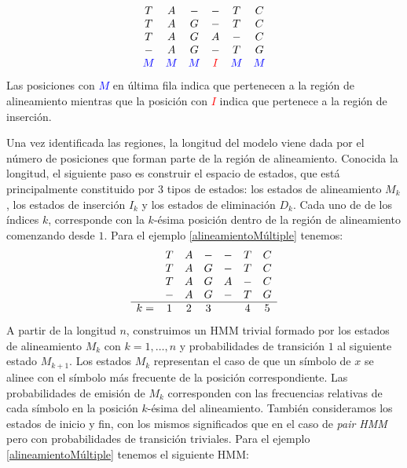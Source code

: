 \begin{exampleth} \label{alineamientoMúltiple}
    \[\begin{array}{c c c c c c}
        T & A & - & -  & T & C \\
        T & A & G & -  & T & C \\
        T & A & G & A  & - & C \\
        - & A & G & -  & T & G \\
        \textcolor{blue}{M} & \textcolor{blue}{M} & \textcolor{blue}{M} & \textcolor{red}{I} & \textcolor{blue}{M} & \textcolor{blue}{M}
    \end{array}\]    
    Las posiciones con \textcolor{blue}{$M$} en última fila indica que pertenecen a la región de alineamiento mientras que la posición con \textcolor{red}{$I$} indica que pertenece a la región de inserción.
\end{exampleth}

Una vez identificada las regiones, la longitud del modelo viene dada por el número de posiciones que forman parte de la región de alineamiento. Conocida la longitud, el siguiente paso es construir el espacio de estados, que está principalmente constituido por $3$ tipos de estados: los estados de alineamiento $M_k$, los estados de inserción $I_k$ y los estados de eliminación $D_k$. Cada uno de de los índices $k$, corresponde con la $k$-ésima posición dentro de la región de alineamiento comenzando desde $1$. 
Para el ejemplo \ref{alineamientoMúltiple} tenemos:
\[\begin{array}{c c c c c c c}
   & T & A & - & -  & T & C \\
   & T & A & G & -  & T & C \\
   & T & A & G & A  & - & C \\
   & - & A & G & -  & T & G \\
   \hline
  k= & 1 & 2 & 3 & & 4 & 5 
\end{array}\]   
A partir de la longitud $n$, construimos un HMM trivial formado por los estados de alineamiento $M_k$ con $k=1,\dots, n$ y probabilidades de transición $1$ al siguiente estado $M_{k+1}$. Los estados $M_k$ representan el caso de que un símbolo de $x$ se alinee con el símbolo más frecuente de la posición correspondiente. Las probabilidades de emisión de $M_k$ corresponden con las frecuencias relativas de cada símbolo en la posición $k$-ésima del alineamiento. También consideramos los estados de inicio y fin, con los mismos significados que en el caso de \textit{pair HMM} pero con probabilidades de transición triviales. Para el ejemplo \ref{alineamientoMúltiple} tenemos el siguiente HMM:


